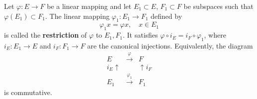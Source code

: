 Let $\varphi: E \to F$ be a linear mapping and let $E_1 \subset E$, $F_1 \subset F$ be subspaces such that $\varphi(E_1) \subset F_1$. The linear mapping $\varphi_1: E_1 \to F_1$ defined by
$$\varphi_1 x = \varphi x, \quad x \in E_1$$
is called the \textbf{restriction} of $\varphi$ to $E_1, F_1$. It satisfies $\varphi \circ i_E = i_F \circ \varphi_1$, where $i_E: E_1 \to E$ and $i_F: F_1 \to F$ are the canonical injections. Equivalently, the diagram
$$\begin{array}{ccc} E & \xrightarrow{\varphi} & F \\ i_E \uparrow & & \uparrow i_F \\ E_1 & \xrightarrow{\varphi_1} & F_1 \end{array}$$
is commutative.
